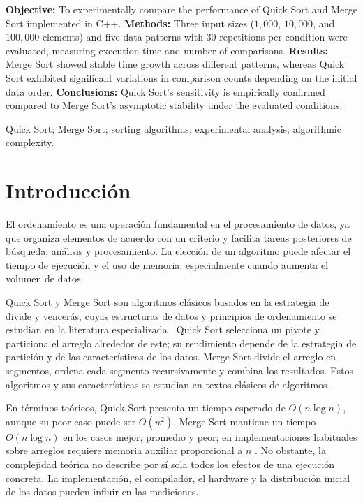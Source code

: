 {\fontsize{11}{13}\selectfont
\textbf{Objective:} To experimentally compare the performance of Quick Sort and Merge Sort implemented in C++. \textbf{Methods:} Three input sizes ($1,000$, $10,000$, and $100,000$ elements) and five data patterns with 30 repetitions per condition were evaluated, measuring execution time and number of comparisons. \textbf{Results:} Merge Sort showed stable time growth across different patterns, whereas Quick Sort exhibited significant variations in comparison counts depending on the initial data order. \textbf{Conclusions:} Quick Sort's sensitivity is empirically confirmed compared to Merge Sort's asymptotic stability under the evaluated conditions.
\par}

\vspace{0.15cm}
{\fontsize{11}{13}\selectfont Quick Sort; Merge Sort; sorting algorithms; experimental analysis; algorithmic complexity.\par}

\vspace{0.35cm}
\twocolumn

\section{Introducción}
El ordenamiento es una operación fundamental en el procesamiento de datos, ya que organiza elementos de acuerdo con un criterio y facilita tareas posteriores de búsqueda, análisis y procesamiento. La elección de un algoritmo puede afectar el tiempo de ejecución y el uso de memoria, especialmente cuando aumenta el volumen de datos.

Quick Sort y Merge Sort son algoritmos clásicos basados en la estrategia de divide y vencerás, cuyas estructuras de datos y principios de ordenamiento se estudian en la literatura especializada \parencite{cormen2022, sedgewick2011, joyanes2020}. Quick Sort selecciona un pivote y particiona el arreglo alrededor de este; su rendimiento depende de la estrategia de partición y de las características de los datos. Merge Sort divide el arreglo en segmentos, ordena cada segmento recursivamente y combina los resultados. Estos algoritmos y sus características se estudian en textos clásicos de algoritmos \parencite{cormen2022,sedgewick2011}.

En términos teóricos, Quick Sort presenta un tiempo esperado de \(O(n\log n)\), aunque su peor caso puede ser \(O(n^2)\). Merge Sort mantiene un tiempo \(O(n\log n)\) en los casos mejor, promedio y peor; en implementaciones habituales sobre arreglos requiere memoria auxiliar proporcional a \(n\) \parencite{cormen2022}. No obstante, la complejidad teórica no describe por sí sola todos los efectos de una ejecución concreta. La implementación, el compilador, el hardware y la distribución inicial de los datos pueden influir en las mediciones.

